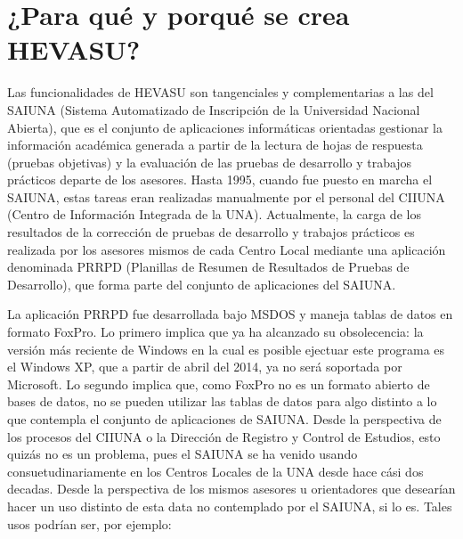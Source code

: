 \documentclass[letterpaper,12pt]{book}
\begin{document}
\section{¿Para qué y porqué se crea HEVASU?}
Las funcionalidades de HEVASU son tangenciales y complementarias a las del SAIUNA (Sistema Automatizado de Inscripción de la Universidad Nacional Abierta), que es el conjunto de aplicaciones informáticas orientadas gestionar 
la información académica generada a partir de la lectura de hojas de respuesta (pruebas objetivas) y la evaluación de las pruebas de desarrollo y trabajos prácticos departe de los asesores. Hasta 1995, cuando fue puesto en marcha el SAIUNA, estas tareas eran realizadas manualmente por el personal del CIIUNA (Centro de Información Integrada de la UNA).  Actualmente, la carga de los resultados de la corrección de pruebas de desarrollo y trabajos prácticos es realizada por los asesores mismos de cada Centro Local mediante una aplicación denominada PRRPD (Planillas de Resumen de Resultados de Pruebas de Desarrollo), que forma parte del conjunto de aplicaciones del SAIUNA.

La aplicación PRRPD fue desarrollada bajo MSDOS y maneja tablas de datos en formato FoxPro. Lo primero implica que ya ha alcanzado su obsolecencia: la versión más reciente de Windows en la cual es posible ejectuar este programa es el Windows XP, que a partir de abril del 2014, ya no será soportada por Microsoft. Lo segundo implica que, como FoxPro no es un formato abierto de bases de datos, no se pueden utilizar las tablas de datos para algo distinto a lo que contempla el conjunto de aplicaciones de SAIUNA.  Desde la perspectiva de los procesos del CIIUNA o la Dirección de Registro y Control de Estudios, esto quizás no es un problema, pues el SAIUNA se ha venido usando consuetudinariamente en los Centros Locales de la UNA desde hace cási dos decadas.  Desde la perspectiva de los mismos asesores u orientadores que desearían hacer un uso distinto de esta data no contemplado por el SAIUNA, si lo es. Tales usos  podrían ser, por ejemplo:  
\end{document}
